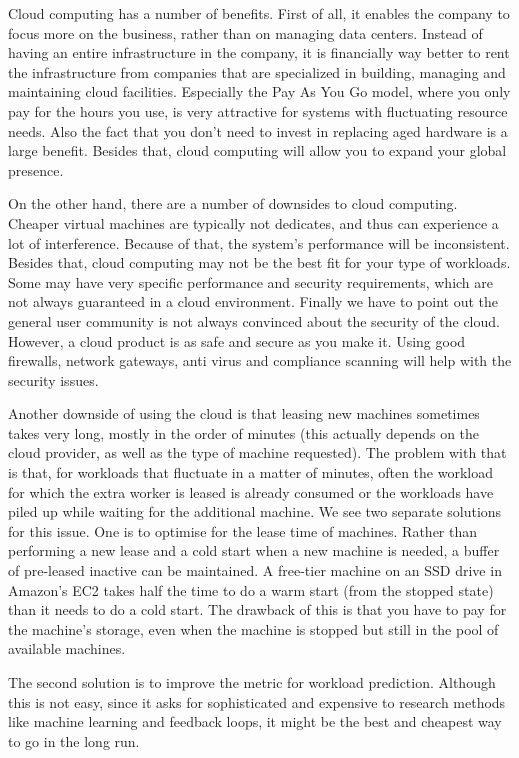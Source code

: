 \documentclass{stylesheet}
\begin{document}
Cloud computing has a number of benefits. First of all, it enables the company to focus more on the business, rather than on managing data centers. Instead of having an entire infrastructure in the company, it is financially way better to rent the infrastructure from companies that are specialized in building, managing and maintaining cloud facilities. Especially the Pay As You Go model, where you only pay for the hours you use, is very attractive for systems with fluctuating resource needs. Also the fact that you don't need to invest in replacing aged hardware is a large benefit. Besides that, cloud computing will allow you to expand your global presence.

On the other hand, there are a number of downsides to cloud computing. Cheaper virtual machines are typically not dedicates, and thus can experience a lot of interference. Because of that, the system's performance will be inconsistent. Besides that, cloud computing may not be the best fit for your type of workloads. Some may have very specific performance and security requirements, which are not always guaranteed in a cloud environment. Finally we have to point out the general user community is not always convinced about the security of the cloud. However, a cloud product is as safe and secure as you make it. Using good firewalls, network gateways, anti virus and compliance scanning will help with the security issues.

Another downside of using the cloud is that leasing new machines sometimes takes very long, mostly in the order of minutes (this actually depends on the cloud provider, as well as the type of machine requested). The problem with that is that, for workloads that fluctuate in a matter of minutes, often the workload for which the extra worker is leased is already consumed or the workloads have piled up while waiting for the additional machine. We see two separate solutions for this issue. One is to optimise for the lease time of machines. Rather than performing a new lease and a cold start when a new machine is needed, a buffer of pre-leased inactive can be maintained. A free-tier machine on an SSD drive in Amazon's EC2 takes half the time to do a warm start (from the stopped state) than it needs to do a cold start. The drawback of this is that you have to pay for the machine's storage, even when the machine is stopped but still in the pool of available machines.

The second solution is to improve the metric for workload prediction. Although this is not easy, since it asks for sophisticated and expensive to research methods like machine learning and feedback loops, it might be the best and cheapest way to go in the long run.
\end{document}
